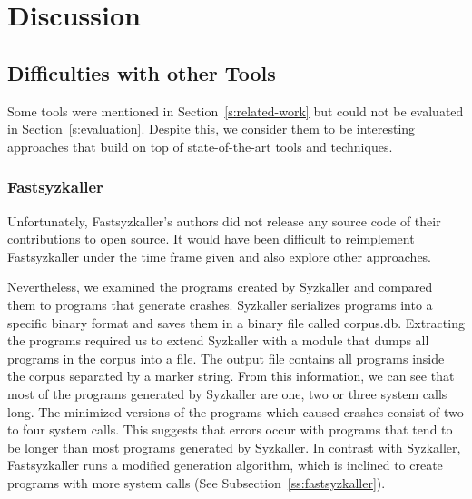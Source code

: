 \section{Discussion}


\subsection{Difficulties with other Tools}

Some tools were mentioned in Section~\ref{s:related-work} but could not be evaluated in Section~\ref{s:evaluation}.
Despite this, we consider them to be interesting approaches that build on top of state-of-the-art tools and techniques.

\subsubsection{Fastsyzkaller}

Unfortunately, Fastsyzkaller's authors did not release any source code of their contributions to open source.
It would have been difficult to reimplement Fastsyzkaller under the time frame given and also explore
other approaches.

Nevertheless, we examined the programs created by Syzkaller and compared them to programs that generate crashes.
Syzkaller serializes programs into a specific binary format and saves them in a binary file called corpus.db.
Extracting the programs required us to extend Syzkaller with a module that dumps all programs in the corpus into a file.
The output file contains all programs inside the corpus separated by a marker string.
From this information, we can see that most of the programs generated by Syzkaller are one, two or three system calls long.
The minimized versions of the programs which caused crashes consist of two to four system calls. This suggests
that errors occur with programs that tend to be longer than most programs generated by Syzkaller.
In contrast with Syzkaller, Fastsyzkaller runs a modified generation algorithm, which is inclined to create programs
with more system calls (See Subsection~\ref{ss:fastsyzkaller}).

